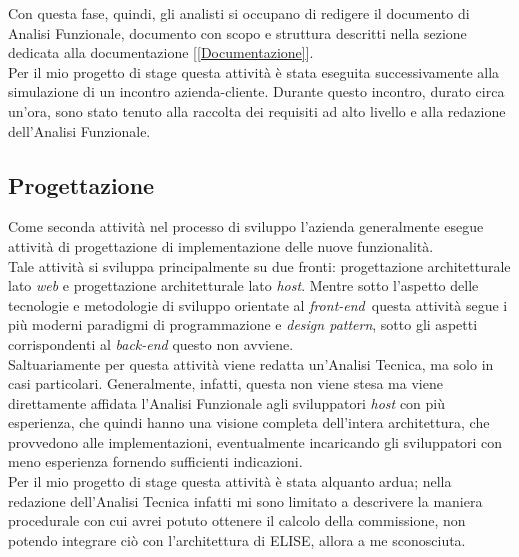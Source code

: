 	Con questa fase, quindi, gli analisti si occupano di redigere il documento di Analisi Funzionale, documento con scopo e struttura descritti nella sezione dedicata alla documentazione [\ref{Documentazione}].\\

	Per il mio progetto di stage questa attività è stata eseguita successivamente alla simulazione di un incontro azienda-cliente. Durante questo incontro, durato circa un'ora, sono stato tenuto alla raccolta dei requisiti ad alto livello e alla redazione dell'Analisi Funzionale.	

\subsection{Progettazione}

	Come seconda attività nel processo di sviluppo l'azienda generalmente esegue attività di progettazione di implementazione delle nuove funzionalità.\\

	Tale attività si sviluppa principalmente su due fronti: progettazione architetturale lato \textit{web} e progettazione architetturale lato \textit{host}. Mentre sotto l'aspetto delle tecnologie e metodologie di sviluppo orientate al \textit{front-end}\glossario\ questa attività segue i più moderni paradigmi di programmazione e \textit{design pattern}, sotto gli aspetti corrispondenti al \textit{back-end} questo non avviene.\\
	
	Saltuariamente per questa attività viene redatta un'Analisi Tecnica, ma solo in casi particolari. Generalmente, infatti, questa non viene stesa ma viene direttamente affidata l'Analisi Funzionale agli sviluppatori \textit{host} con più esperienza, che quindi hanno una visione completa dell'intera architettura, che provvedono alle implementazioni, eventualmente incaricando gli sviluppatori con meno esperienza fornendo sufficienti indicazioni.\\

	Per il mio progetto di stage questa attività è stata alquanto ardua; nella redazione dell'Analisi Tecnica infatti mi sono limitato a descrivere la maniera procedurale con cui avrei potuto ottenere il calcolo della commissione, non potendo integrare ciò con l'architettura di ELISE, allora a me sconosciuta.
	 	
